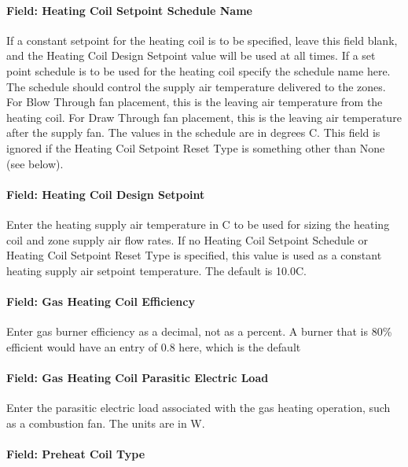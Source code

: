 \paragraph{Field: Heating Coil Setpoint Schedule Name}\label{field-heating-coil-setpoint-schedule-name}

If a constant setpoint for the heating coil is to be specified, leave this field blank, and the Heating Coil Design Setpoint value will be used at all times. If a set point schedule is to be used for the heating coil specify the schedule name here. The schedule should control the supply air temperature delivered to the zones. For Blow Through fan placement, this is the leaving air temperature from the heating coil. For Draw Through fan placement, this is the leaving air temperature after the supply fan. The values in the schedule are in degrees C. This field is ignored if the Heating Coil Setpoint Reset Type is something other than None (see below).

\paragraph{Field: Heating Coil Design Setpoint}\label{field-heating-coil-design-setpoint-1}

Enter the heating supply air temperature in C to be used for sizing the heating coil and zone supply air flow rates. If no Heating Coil Setpoint Schedule or Heating Coil Setpoint Reset Type is specified, this value is used as a constant heating supply air setpoint temperature. The default is 10.0C.

\paragraph{Field: Gas Heating Coil Efficiency}\label{field-gas-heating-coil-efficiency-3}

Enter gas burner efficiency as a decimal, not as a percent. A burner that is 80\% efficient would have an entry of 0.8 here, which is the default

\paragraph{Field: Gas Heating Coil Parasitic Electric Load}\label{field-gas-heating-coil-parasitic-electric-load-3}

Enter the parasitic electric load associated with the gas heating operation, such as a combustion fan. The units are in W.

\paragraph{Field: Preheat Coil Type}\label{field-preheat-coil-type}

